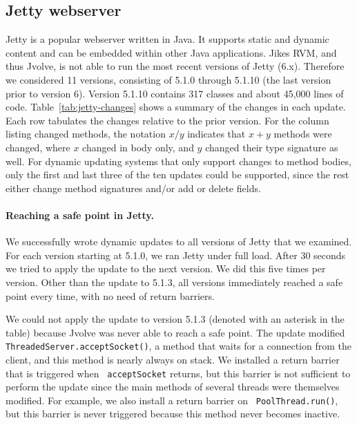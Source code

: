\documentclass[9pt]{sigplanconf}
\newcommand{\DSU}{{\sc Jvolve}}
\newcommand{\JikesRVM}{Jikes RVM}
\begin{document}
\subsection{Jetty webserver}
\label{subsec:jetty}

Jetty is a popular webserver written in Java. It supports static
and dynamic content and can be embedded 
within other Java applications. \JikesRVM, and thus \DSU, is not able to run the
most recent versions of Jetty (6.x).  Therefore we considered 11
versions, consisting of 5.1.0 through 5.1.10 (the last version prior to
version 6).  Version 5.1.10 contains 317 classes and about 45,000 lines
of code.  Table~\ref{tab:jetty-changes} shows a summary of the changes
in each update.  Each row tabulates the changes relative
to the prior version. For the column listing changed methods, the
notation $x/y$ indicates that $x+y$ methods were changed, where $x$
changed in body only, and $y$ changed their type signature as well.
For dynamic updating systems that only support changes to method
bodies, only the first and last three of the ten updates could be
supported, since the rest either change method signatures
and/or add or delete fields.

\paragraph{Reaching a safe point in Jetty.}
We  successfully wrote dynamic updates to all
versions of Jetty that we examined. For each version starting at 5.1.0, we ran
Jetty under full load. After 30 seconds we tried to apply the update to the
next version. We did this five times per version.  Other than the
update to 5.1.3, all versions immediately 
reached a safe point every time, with no need of return barriers.

We could not apply the update to version 5.1.3 (denoted with an
asterisk in the table) 
because \DSU{} was never able to reach a safe point. The update modified
{\tt ThreadedServer.accept\-Socket()}, a method that waits for a connection
from the client, and this method is nearly always on stack. 
We installed a return barrier that is triggered when {\tt
  acceptSocket} returns, but this barrier is not sufficient to perform the
update since the main methods of several threads were themselves
modified. For example, we also install a return barrier on {\tt
  Pool\-Thread.run()}, but this barrier is never triggered because
this method never becomes inactive.

\end{document}
